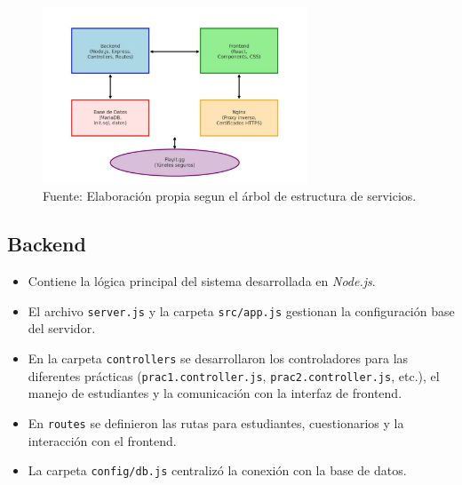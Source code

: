 \documentclass[letter,oneside,12pt,spanish]{report}
\begin{document}
\begin{figure}[ht]
	\centering
	\includegraphics[width=0.7\textwidth]{Figs/Arquitectura_AVA.pdf}
	\label{fig:AVA}
	\\Fuente: Elaboración propia segun el árbol de estructura de servicios.
\end{figure}

\subsection{Backend}
\begin{itemize}
    \item Contiene la lógica principal del sistema desarrollada en \textit{Node.js}.
    \item El archivo \texttt{server.js} y la carpeta \texttt{src/app.js} gestionan la configuración base del servidor.
    \item En la carpeta \texttt{controllers} se desarrollaron los controladores para las diferentes prácticas (\texttt{prac1.controller.js}, \texttt{prac2.controller.js}, etc.), el manejo de estudiantes y la comunicación con la interfaz de frontend.
    \item En \texttt{routes} se definieron las rutas para estudiantes, cuestionarios y la interacción con el frontend.
    \item La carpeta \texttt{config/db.js} centralizó la conexión con la base de datos.
\end{itemize}
\end{document}
